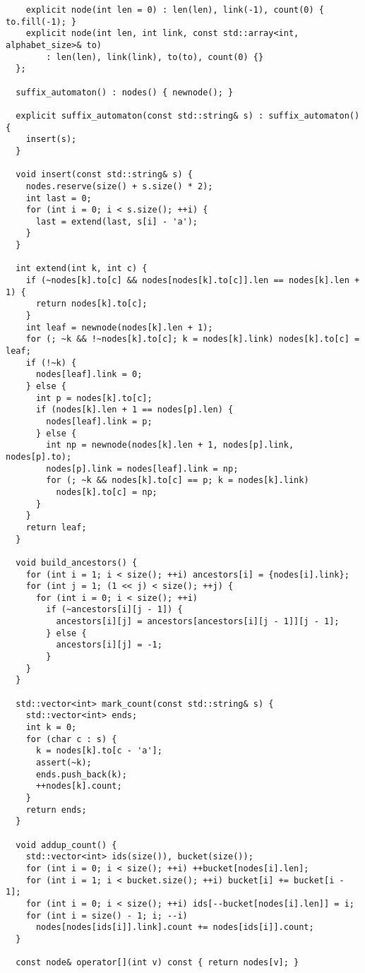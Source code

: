 \documentclass{article}
\begin{document}
\begin{multicols}{2}
\begin{lstlisting}
    explicit node(int len = 0) : len(len), link(-1), count(0) { to.fill(-1); }
    explicit node(int len, int link, const std::array<int, alphabet_size>& to)
        : len(len), link(link), to(to), count(0) {}
  };

  suffix_automaton() : nodes() { newnode(); }

  explicit suffix_automaton(const std::string& s) : suffix_automaton() {
    insert(s);
  }

  void insert(const std::string& s) {
    nodes.reserve(size() + s.size() * 2);
    int last = 0;
    for (int i = 0; i < s.size(); ++i) {
      last = extend(last, s[i] - 'a');
    }
  }

  int extend(int k, int c) {
    if (~nodes[k].to[c] && nodes[nodes[k].to[c]].len == nodes[k].len + 1) {
      return nodes[k].to[c];
    }
    int leaf = newnode(nodes[k].len + 1);
    for (; ~k && !~nodes[k].to[c]; k = nodes[k].link) nodes[k].to[c] = leaf;
    if (!~k) {
      nodes[leaf].link = 0;
    } else {
      int p = nodes[k].to[c];
      if (nodes[k].len + 1 == nodes[p].len) {
        nodes[leaf].link = p;
      } else {
        int np = newnode(nodes[k].len + 1, nodes[p].link, nodes[p].to);
        nodes[p].link = nodes[leaf].link = np;
        for (; ~k && nodes[k].to[c] == p; k = nodes[k].link)
          nodes[k].to[c] = np;
      }
    }
    return leaf;
  }

  void build_ancestors() {
    for (int i = 1; i < size(); ++i) ancestors[i] = {nodes[i].link};
    for (int j = 1; (1 << j) < size(); ++j) {
      for (int i = 0; i < size(); ++i)
        if (~ancestors[i][j - 1]) {
          ancestors[i][j] = ancestors[ancestors[i][j - 1]][j - 1];
        } else {
          ancestors[i][j] = -1;
        }
    }
  }

  std::vector<int> mark_count(const std::string& s) {
    std::vector<int> ends;
    int k = 0;
    for (char c : s) {
      k = nodes[k].to[c - 'a'];
      assert(~k);
      ends.push_back(k);
      ++nodes[k].count;
    }
    return ends;
  }

  void addup_count() {
    std::vector<int> ids(size()), bucket(size());
    for (int i = 0; i < size(); ++i) ++bucket[nodes[i].len];
    for (int i = 1; i < bucket.size(); ++i) bucket[i] += bucket[i - 1];
    for (int i = 0; i < size(); ++i) ids[--bucket[nodes[i].len]] = i;
    for (int i = size() - 1; i; --i)
      nodes[nodes[ids[i]].link].count += nodes[ids[i]].count;
  }

  const node& operator[](int v) const { return nodes[v]; }


\end{lstlisting}
\end{multicols}
\end{document}
